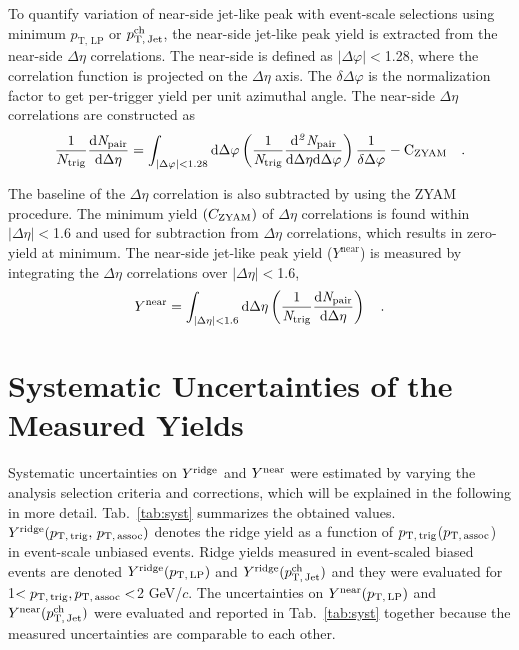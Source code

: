 To quantify variation of near-side jet-like peak with event-scale selections using minimum $p_\mathrm{T,\,LP}$ or $p_\mathrm{T,\,Jet}^\mathrm{ch}$, the near-side jet-like peak yield is extracted from the near-side $\Delta\eta$ correlations. The near-side is defined as $|\Delta\varphi|<$1.28, where the correlation function is projected on the $\Delta\eta$ axis. The $\delta\Delta\varphi$ is the normalization factor to get per-trigger yield per unit azimuthal angle. The near-side $\Delta\eta$ correlations are constructed as
\begin{eqnarray}
\frac{1}{N_{\rm{trig}}} \frac{ \rm{d}\it{}N_{\rm{pair}} }{ \rm{d}\Delta\eta } = \int_{|\Delta \varphi|<1.28} \rm{d} \Delta \varphi \left( \frac{1}{\it{N}_{\rm{trig}}} \frac{ \rm{d}\it{}^{2} N_{\rm{pair}} }{ \rm{d}\Delta\eta d\Delta\varphi} \right) \dfrac{1}{\delta\Delta\varphi} - C_{\rm{ZYAM}} \quad. 
\end{eqnarray}

The baseline of the $\Delta\eta$ correlation is also subtracted by using the ZYAM procedure. The minimum yield $(C_{\rm{ZYAM}})$ of $\Delta\eta$ correlations is found within $|\Delta\eta|<$1.6 and used for subtraction from  $\Delta\eta$ correlations, which results in zero-yield at minimum. The near-side jet-like peak yield ($Y^{\mathrm{near}}$) is measured by integrating the $\Delta\eta$ correlations over $|\Delta\eta|<$1.6,
\begin{eqnarray}
Y^{\rm{near}} = \int_{|\Delta \eta|<1.6} \rm{d} \Delta\eta \left( \frac{1}{\it{N}_{\rm{trig}}} \frac{ \rm{d}\it{}N_{\rm{pair}} }{ \rm{d}\Delta\eta } \right)\quad.
\end{eqnarray}



\section{Systematic Uncertainties of the Measured Yields}
\label{sec:uncertainties}

Systematic uncertainties on $Y^{\rm{ridge}}$ and $Y^{\rm{near}}$ were estimated by varying the analysis selection criteria and corrections, which will be explained in the following in more detail. Tab.~\ref{tab:syst} summarizes the obtained values. $Y^{\rm{ridge}}(p_\mathrm{T,\,trig},\,p_\mathrm{T,\,assoc})$ denotes the ridge yield as a function of $p_\mathrm{T,\,trig}$($p_\mathrm{T,\,assoc}$) in event-scale unbiased events. Ridge yields measured in event-scaled biased events are denoted $Y^{\rm{ridge}}(p_\mathrm{T,\,LP})$ and $Y^{\rm{ridge}}(p_\mathrm{T,\,Jet}^\mathrm{ch})$ and they were evaluated for 1$<p_\mathrm{T,\,trig}, p_\mathrm{T,\,assoc}<$2 GeV/$c$. The uncertainties on $Y^{\rm{near}}(p_\mathrm{T,\,LP})$ and $Y^{\rm{near}}(p_\mathrm{T,\,Jet}^\mathrm{ch})$ were evaluated and reported in Tab.~\ref{tab:syst} together because the measured uncertainties are comparable to each other.

